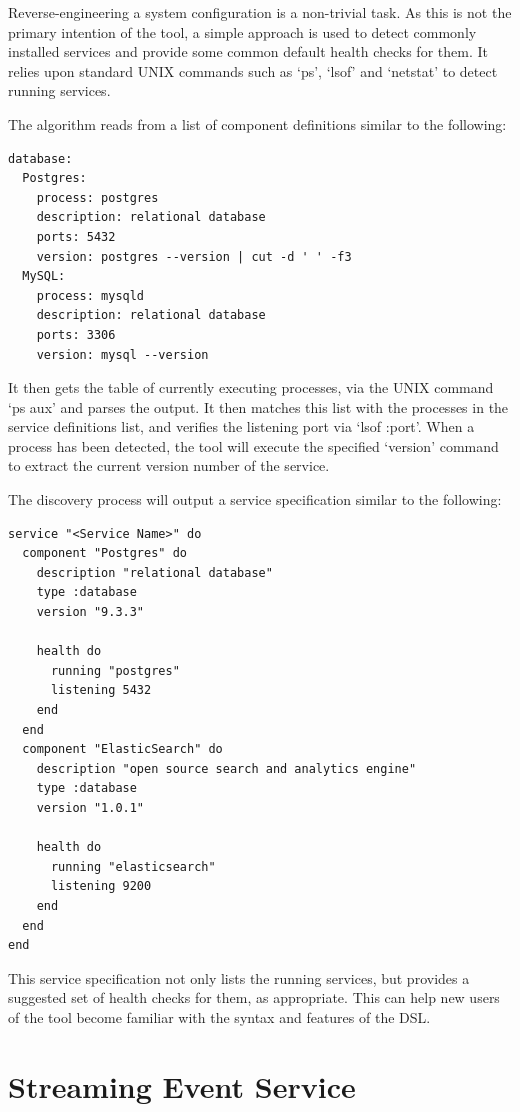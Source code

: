 \documentclass{cshonours}
\begin{document}
Reverse-engineering a system configuration is a non-trivial task. As this is not the primary intention of the tool, a simple approach is used to detect commonly installed services and provide some common default health checks for them. It relies upon standard UNIX commands such as `ps', `lsof' and `netstat' to detect running services.

The algorithm reads from a list of component definitions similar to the following:

\begin{verbatim}
database:
  Postgres:
    process: postgres
    description: relational database
    ports: 5432
    version: postgres --version | cut -d ' ' -f3
  MySQL:
    process: mysqld
    description: relational database
    ports: 3306
    version: mysql --version
\end{verbatim}

It then gets the table of currently executing processes, via the UNIX command `ps aux' and parses the output. It then matches this list with the processes in the service definitions list, and verifies the listening port via `lsof :port'. When a process has been detected, the tool will execute the specified `version' command to extract the current version number of the service.

The discovery process will output a service specification similar to the following:

\begin{verbatim}
service "<Service Name>" do
  component "Postgres" do
    description "relational database"
    type :database
    version "9.3.3"

    health do
      running "postgres"
      listening 5432
    end
  end
  component "ElasticSearch" do
    description "open source search and analytics engine"
    type :database
    version "1.0.1"

    health do
      running "elasticsearch"
      listening 9200
    end
  end
end
\end{verbatim}

This service specification not only lists the running services, but provides a suggested set of health checks for them, as appropriate. This can help new users of the tool become familiar with the syntax and features of the DSL.

\pagebreak
\section{Streaming Event Service}
\end{document}
